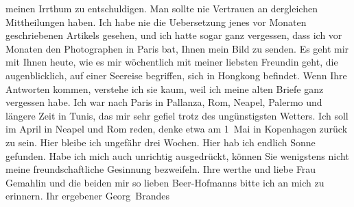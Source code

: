\begin{ledgroupsized}[t]{13cm}
                    meinen Irrthum zu entschuldigen. Man sollte nie Vertrauen an dergleichen
                    Mittheilungen haben.\pend
           \pstart
           Ich habe nie die Uebersetzung jenes vor Monaten geschriebenen Artikels gesehen, und ich hatte sogar
                    ganz vergessen, dass ich vor Monaten den Photographen in Paris bat, Ihnen mein Bild\pwindex{?? [Fotograf in Paris] *~1912@\textsc{?? [Fotograf in Paris]} (*~1912)!Georg Brandes]1913@\strich\emph{[Georg Brandes]} {[}1913{]}|pwv} zu senden.\pend
           \pstart
           Es geht mir mit Ihnen heute, wie es mir wöchentlich mit meiner liebsten Freundin geht, die
                    augenblicklich, auf einer Seereise begriffen, sich in Hongkong befindet. Wenn Ihre Antworten kommen, verstehe
                    ich sie kaum, weil ich meine alten Briefe ganz vergessen habe.\pend
           \pstart
           Ich war nach Paris in Pallanza, Rom, Neapel, Palermo und längere Zeit in Tunis,
                    das mir sehr gefiel trotz des ungünstigsten Wetters.\pend
           \pstart
           Ich soll im April in Neapel und Rom reden, denke etwa am 1 Mai in
                        Kopenhagen zurück zu sein. Hier bleibe
                    ich ungefähr {\pb}drei Wochen.
                    Hier hab ich endlich Sonne gefunden.\pend
           \pstart
           Habe ich mich auch unrichtig ausgedrückt, können Sie wenigstens nicht meine
                    freundschaftliche Gesinnung bezweifeln.\pend
           \pstart
           Ihre werthe und liebe Frau Gemahlin und die beiden mir so lieben Beer-Hofmanns bitte ich an mich zu erinnern.\pend
           \pstart Ihr ergebener \spacefill\mbox{Georg Brandes}\pend{}
         
         \endnumbering{}\end{ledgroupsized}  \newcommand{\dateiname}{L02116}\newcommand{\titel}{Georg Brandes an Arthur Schnitzler, 5. 3. 1913}\newcommand{\editorInnen}{Martin Anton Müller und Gerd-Hermann Susen}
      